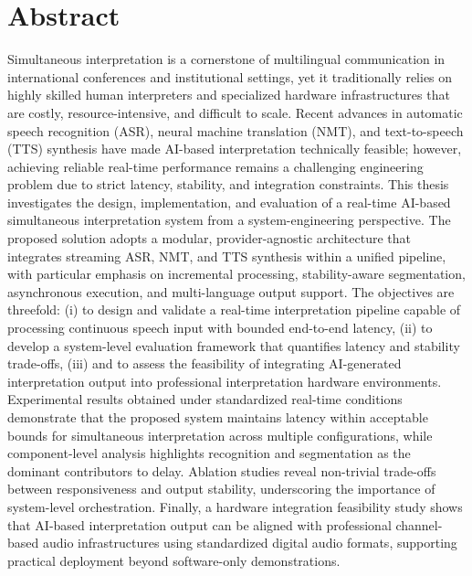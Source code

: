 \chapter*{Abstract}

Simultaneous interpretation is a cornerstone of multilingual communication in international conferences and institutional settings, yet it traditionally relies on highly skilled human interpreters and specialized hardware infrastructures that are costly, resource-intensive, and difficult to scale. Recent advances in automatic speech recognition (ASR), neural machine translation (NMT), and text-to-speech (TTS) synthesis have made AI-based interpretation technically feasible; however, achieving reliable real-time performance remains a challenging engineering problem due to strict latency, stability, and integration constraints. This thesis investigates the design, implementation, and evaluation of a real-time AI-based simultaneous interpretation system from a system-engineering perspective. The proposed solution adopts a modular, provider-agnostic architecture that integrates streaming ASR, NMT, and TTS synthesis within a unified pipeline, with particular emphasis on incremental processing, stability-aware segmentation, asynchronous execution, and multi-language output support. The objectives are threefold: (i) to design and validate a real-time interpretation pipeline capable of processing continuous speech input with bounded end-to-end latency, (ii) to develop a system-level evaluation framework that quantifies latency and stability trade-offs, (iii) and to assess the feasibility of integrating AI-generated interpretation output into professional interpretation hardware environments. Experimental results obtained under standardized real-time conditions demonstrate that the proposed system maintains latency within acceptable bounds for simultaneous interpretation across multiple configurations, while component-level analysis highlights recognition and segmentation as the dominant contributors to delay. Ablation studies reveal non-trivial trade-offs between responsiveness and output stability, underscoring the importance of system-level orchestration. Finally, a hardware integration feasibility study shows that AI-based interpretation output can be aligned with professional channel-based audio infrastructures using standardized digital audio formats, supporting practical deployment beyond software-only demonstrations.